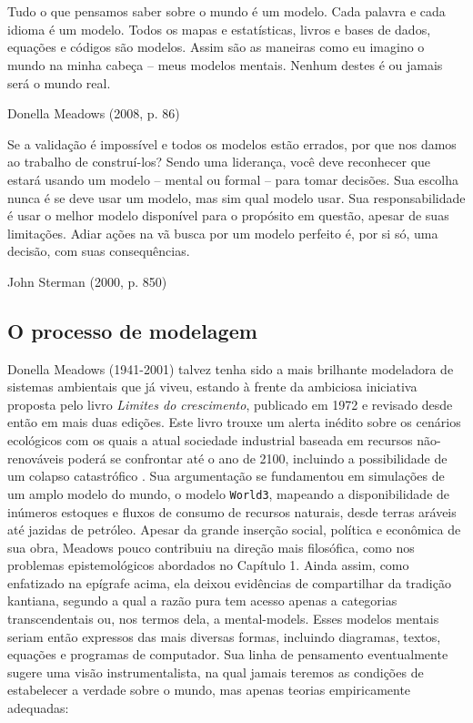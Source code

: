 \documentclass[./main.tex]{subfiles}
\begin{document}
\chapter{\chapSys} \label{chap:systems}

\setlength{\parskip}{0mm}

\epigraph{\small{Tudo o que pensamos saber sobre o mundo é um modelo. Cada palavra e cada idioma é um modelo. Todos os mapas e estatísticas, livros e bases de dados, equações e códigos são modelos. Assim são as maneiras como eu imagino o mundo na minha cabeça -- meus modelos mentais. Nenhum destes é ou jamais será o mundo real.}}{Donella Meadows (2008, p. 86) \cite{meadows2008}}

\epigraph{\small{Se a validação é impossível e todos os modelos estão errados, por que nos damos ao trabalho de construí-los? Sendo uma liderança, você deve reconhecer que estará usando um modelo -- mental ou formal -- para tomar decisões. Sua escolha nunca é se deve usar um modelo, mas sim qual modelo usar. Sua responsabilidade é usar o melhor modelo disponível para o propósito em questão, apesar de suas limitações. Adiar ações na vã busca por um modelo perfeito é, por si só, uma decisão, com suas consequências.}}{John Sterman (2000, p. 850) \cite{sterman2000}}

\setlength{\parskip}{\myparskip}

\section{O processo de modelagem} \label{sec:sys:process}

\par Donella Meadows (1941-2001) talvez tenha sido a mais brilhante modeladora de sistemas ambientais que já viveu, estando à frente da ambiciosa iniciativa proposta pelo livro \textit{Limites do crescimento}, publicado em 1972 e revisado desde então em mais duas edições. Este livro trouxe um alerta inédito sobre os cenários ecológicos com os quais a atual sociedade industrial baseada em recursos não-renováveis poderá se confrontar até o ano de 2100, incluindo a possibilidade de um colapso catastrófico \cite{meadows1974}. Sua argumentação se fundamentou em simulações de um amplo modelo do mundo, o modelo \texttt{World3}, mapeando a disponibilidade de inúmeros estoques e fluxos de consumo de recursos naturais, desde terras aráveis até jazidas de petróleo. Apesar da grande inserção social, política e econômica de sua obra, Meadows pouco contribuiu na direção mais filosófica, como nos problemas epistemológicos abordados no Capítulo 1. Ainda assim, como enfatizado na epígrafe acima, ela deixou evidências de compartilhar da tradição kantiana, segundo a qual a razão pura tem acesso apenas a categorias transcendentais ou, nos termos dela, a \gls{mental-models}. Esses modelos mentais seriam então expressos das mais diversas formas, incluindo diagramas, textos, equações e programas de computador. Sua linha de pensamento eventualmente sugere uma visão instrumentalista, na qual jamais teremos as condições de estabelecer a verdade sobre o mundo, mas apenas teorias empiricamente adequadas:
\end{document}

